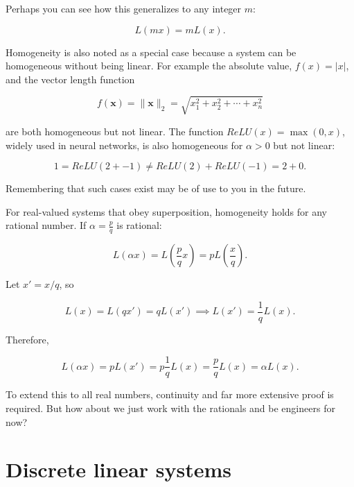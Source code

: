 \documentclass[
  letterpaper,
]{book}
\begin{document}
Perhaps you can see how this generalizes to any integer \(m\):

\[
L(m x) = m L(x).
\]

Homogeneity is also noted as a special case because a system can be
homogeneous without being linear. For example the absolute value,
\(f(x) = |x|\), and the vector length function

\[
f(\mathbf{x}) = \|\mathbf{x}\|_2 = \sqrt{x_1^2 + x_2^2 + \cdots + x_n^2}
\]

are both homogeneous but not linear. The function
\(ReLU(x) = \max(0, x)\), widely used in neural networks, is also
homogeneous for \(\alpha > 0\) but not linear:

\[
1 = ReLU(2 + -1) \neq ReLU(2) + ReLU(-1) = 2 + 0.
\]

Remembering that such cases exist may be of use to you in the future.

\begin{tcolorbox}[enhanced jigsaw, opacityback=0, breakable, coltitle=black, leftrule=.75mm, left=2mm, colframe=quarto-callout-note-color-frame, opacitybacktitle=0.6, bottomtitle=1mm, bottomrule=.15mm, toprule=.15mm, title=\textcolor{quarto-callout-note-color}{\faInfo}\hspace{0.5em}{Extension to Rational Numbers}, titlerule=0mm, toptitle=1mm, colback=white, rightrule=.15mm, colbacktitle=quarto-callout-note-color!10!white, arc=.35mm]

For real-valued systems that obey superposition, homogeneity holds for
any rational number. If \(\alpha = \frac{p}{q}\) is rational:

\[
L(\alpha x) = L\left(\frac{p}{q}x\right) = p L\left(\frac{x}{q}\right).
\]

Let \(x' = x/q\), so

\[
L(x) = L(q x') = q L(x') \implies L(x') = \frac{1}{q} L(x).
\]

Therefore,

\[
L(\alpha x) = p L(x') = p \frac{1}{q} L(x) = \frac{p}{q} L(x) = \alpha L(x).
\]

To extend this to all real numbers, continuity and far more extensive
proof is required. But how about we just work with the rationals and be
engineers for now?

\end{tcolorbox}

\section{Discrete linear systems}\label{sec-ls-discrete}
\end{document}
